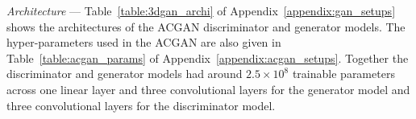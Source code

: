 \documentclass[twocolumn]{article}
\numberwithin{equation}{section}
\begin{document}




\textit{Architecture} --- 
Table~\ref{table:3dgan_archi} of Appendix~\ref{appendix:gan_setups} shows the architectures of the ACGAN discriminator 
and generator models. The hyper-parameters used in the ACGAN are also given in Table~\ref{table:acgan_params} of 
Appendix~\ref{appendix:acgan_setups}. Together the discriminator and generator models had around $2.5\times10^8$ trainable 
parameters across one linear layer and three convolutional layers for the generator model and three convolutional layers 
for the discriminator model. \\
\end{document}
